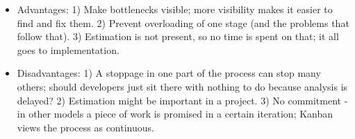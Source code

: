 \begin{itemize} 
	\item Advantages: 1) Make bottlenecks visible; more visibility makes it easier to find and fix them. 2) Prevent overloading of one stage (and the problems that follow that). 3) Estimation is not present, so no time is spent on that; it all goes to implementation.
	\item Disadvantages: 1) A stoppage in one part of the process can stop many others; should developers just sit there with nothing to do because analysis is delayed? 2) Estimation might be important in a project. 3) No commitment - in other models a piece of work is promised in a certain iteration; Kanban views the process as continuous. 
\end{itemize}




